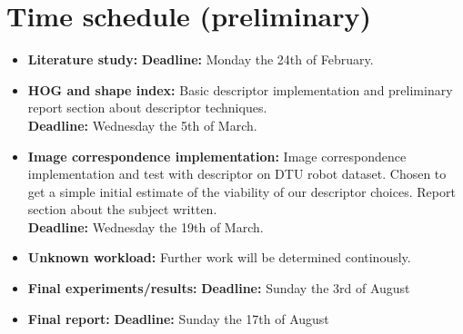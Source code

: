 \documentclass[11pt,a4paper]{article}
\begin{document}
\section{Time schedule \small{(preliminary)}}

\begin{itemize}
    \item{\textbf{Literature study:}
        \textbf{Deadline:} Monday the 24th of February.}
    \item{\textbf{HOG and shape index:} Basic descriptor implementation and
        preliminary report section about descriptor techniques. \\
        \textbf{Deadline:} Wednesday the 5th of March.}
    \item{\textbf{Image correspondence implementation:} Image correspondence
        implementation and test with descriptor on DTU robot dataset. Chosen to
        get a simple initial estimate of the viability of our descriptor choices.
        Report section about the subject written. \\
        \textbf{Deadline:} Wednesday the 19th of March.}
    \item{\textbf{Unknown workload:} Further work will be determined
    continously.}
    \item{\textbf{Final experiments/results:}
        \textbf{Deadline:} Sunday the 3rd of August}
    \item{\textbf{Final report:}
        \textbf{Deadline:} Sunday the 17th of August}
\end{itemize}



\end{document}
